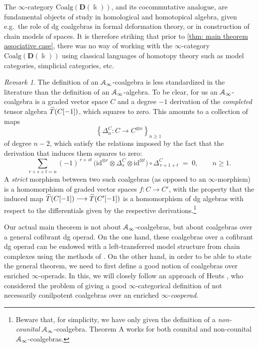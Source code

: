 \documentclass[a4paper,12pt]{amsart}
\renewcommand{\mathcal}{\EuScript}
\theoremstyle{plain}
\theoremstyle{definition}
\theoremstyle{remark}
\newtheorem{remark}[theorem]{\sc Remark}%
\newcommand{\kk}{\Bbbk}
\begin{document}
The $\infty$-category $\mathrm{Coalg}(\mathbf D(\kk))$, and its cocommutative analogue, are fundamental objects of study in homological and homotopical algebra, given e.g.\ the role of dg coalgebras in formal deformation theory, or in construction of chain models of spaces. It is therefore striking that prior to \cref{thm: main theorem associative case}, there was no way of working with the $\infty$-category $\mathrm{Coalg}(\mathbf D(\kk))$ using classical languages of homotopy theory such as model categories, simplicial categories, etc. 

    \begin{remark}The definition of an $\mathcal A_\infty$-coalgebra is less standardized in the literature than the definition of an $\mathcal A_\infty$-algebra. To be clear, for us an $\mathcal A_\infty$-coalgebra is a graded vector space $C$ and a degree $-1$ derivation of the \emph{completed} tensor algebra $\smash{\widehat T}(C[-1])$, which squares to zero. This amounts to a collection of maps 
    \[
    \left\{ \Delta_n^C: C \longrightarrow C^{\otimes n} \right\}_{n \geq 1}~
    \]
    of degree $n-2$, which satisfy the relations imposed by the fact that the derivation that induces them squares to zero: \[
\sum_{r+s+t = n}
(-1)^{\,r + s t}\,
\bigl(
\mathrm{id}^{\otimes r}
\otimes \Delta_s^C
\otimes \mathrm{id}^{\otimes t}
\bigr)
\circ \Delta_{\,r+1+t}^C
\;=\; 0,
\qquad n \ge 1 .
\]
    A \emph{strict} morphism between two such coalgebras (as opposed to an $\infty$-morphism) is a homomorphism of graded vector spaces $f: C \longrightarrow C'$, with the property that the induced map $\smash{\widehat T}(C[-1]) \longrightarrow \smash{\widehat T}(C'[-1])$ is a homomorphism of dg algebras with respect to the differentials given by the respective derivations.\footnote{Beware that, for simplicity, we have only given the definition of a \textit{non-counital}  $\mathcal A_\infty$-coalgebra. Theorem A works for both counital and non-counital $\mathcal A_\infty$-coalgebras.}
    \end{remark}
    
Our actual main theorem is not about $\mathcal A_\infty$-coalgebras, but about coalgebras over a general cofibrant dg operad. On the one hand, these coalgebras over a cofibrant dg operad can be endowed with a left-transferred model structure from chain complexes using the methods of \cite{BHKKRS, HKRS, GKR}. On the other hand, in order to be able to state the general theorem, we need to first define a good notion of coalgebras over enriched $\infty$-operads. 
In this, we will closely follow an approach of Heuts \cite[Appendix A]{heuts2024}, who considered the problem of giving a good $\infty$-categorical definition of not necessarily conilpotent coalgebras over an enriched $\infty$-\emph{cooperad}.  
\end{document}
